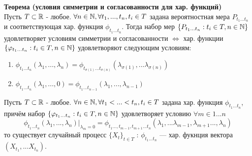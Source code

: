 \begin{theorem}
    \textbf{Теорема (условия симметрии и согласованности для хар. функций)} \\
    Пусть $T \subset \mathbb{R}$ - любое.  $ \forall n  \in \mathbb{N}, \forall t_1, ...,  t_n, t_i \in T $ задана вероятностная мера $P_{t_1...t_n}$ и соответствующая хар. функция $\phi_{t_1...t_n}$. Тогда набор мер  $\{P_{t_1...t_n}: t_i \in T, n\in \mathbb{N}\}$ удовлетворяет условиям симметрии и согласованности $\Longleftrightarrow$ хар. функции  $\{\varphi_{t_1...t_n}: t_i \in T, n\in \mathbb{N}\}$ удовлетворяют следующим
условиям: \begin{enumerate}
    \item $\phi_{t_1...t_n}(\lambda_1, ..., \lambda_n) = \phi_{t_{\sigma(1)}...t_{\sigma(n)}}(\lambda_{\sigma(1)} , ... \lambda_{\sigma(n)})$ 
    \item $\phi_{t_1...t_n}(\lambda_1, ..., 0) = \phi_{t_1...t_{n-1}}(\lambda_1, ..., \lambda_{n-1})$
\end{enumerate}
\end{theorem}
\begin{corollary}\label{3.6.1}
Пусть $T \subset \mathbb{R}$ - любое.  $ \forall n  \in \mathbb{N}, \forall t_1 <...< t_n, t_i \in T $ задана хар. функция $\phi_{t_1...t_n}$, причём набор $\{\varphi_{t_1...t_n}: t_i \in T, n\in \mathbb{N}\}$
удовлетворяет условию $\forall m \in 1...n$
$$\phi_{t_1...t_n}(\lambda_1, ..., \lambda_n)|_{\lambda_m = 0} = \phi_{t_1..., t_{m-1}, t_{m+1}...t_n}(\lambda_1, ...\lambda_{m-1},\lambda_{m+1} ..., \lambda_n)$$
то существует случайный процесс $\{X_t\}_{t \in T}$ : $\phi_{t_1...t_n}$ — хар. фукнция вектора $(X_{t_1}, ... X_{t_n})$.
\end{corollary}

